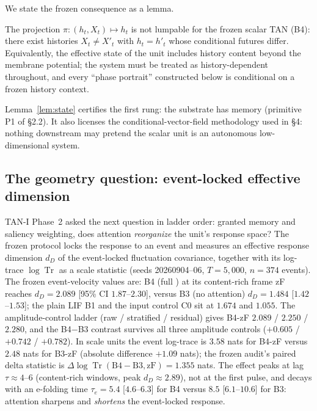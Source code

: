 We state the frozen consequence as a lemma.

\begin{lemma}
\label{lem:state}
The projection $\pi:(h_t,X_t)\mapsto h_t$ is not lumpable for the frozen
scalar TAN (B4): there exist histories $X_t\neq X'_t$ with
$h_t=h'_t$ whose conditional futures differ. Equivalently, the effective
state of the unit includes history content beyond the membrane potential;
the system must be treated as history-dependent throughout, and every
``phase portrait'' constructed below is conditional on a frozen history
context.
\end{lemma}

Lemma~\ref{lem:state} certifies the first rung: the substrate has memory
(primitive P1 of §2.2). It also licenses the conditional-vector-field
methodology used in §4: nothing downstream may pretend the scalar unit is
an autonomous low-dimensional system.

\subsection{The geometry question: event-locked effective dimension}
\label{sec:effdim}

TAN-I Phase~2 asked the next question in ladder order: granted memory and
saliency weighting, does attention \emph{reorganize} the unit's response
space? The frozen protocol locks the response to an event and measures an
effective response dimension $d_D$ of the event-locked fluctuation
covariance, together with its log-trace $\log\operatorname{Tr}$ as a scale
statistic (seeds 20260904--06, $T=5{,}000$, $n=374$ events). The frozen
event-velocity values are: B4 (full \TAN{}) at its content-rich frame zF
reaches $d_D=2.089$ [95\% CI $1.87$--$2.30$], versus B3 (no attention)
$d_D=1.484$ [$1.42$--$1.53$]; the plain LIF B1 and the input control C0
sit at $1.674$ and $1.055$. The amplitude-control ladder (raw /
stratified / residual) gives B4-zF $2.089$ / $2.250$ / $2.280$, and the
B4$-$B3 contrast survives all three amplitude controls
($+0.605$ / $+0.742$ / $+0.782$). In scale units the event log-trace is
$3.58$ nats for B4-zF versus $2.48$ nats for B3-zF (absolute difference
$+1.09$ nats); the frozen audit's paired delta statistic is
$\Delta\log\operatorname{Tr}(\mathrm{B4}-\mathrm{B3},\mathrm{zF})
=1.355$ nats. The effect peaks at lag $\tau\approx4$--$6$ (content-rich
windows, peak $d_D\approx2.89$), not at the first pulse, and decays with
an e-folding time $\tau_e=5.4$ [$4.6$--$6.3$] for B4 versus $8.5$
[$6.1$--$10.6$] for B3: attention sharpens and \emph{shortens} the
event-locked response.

